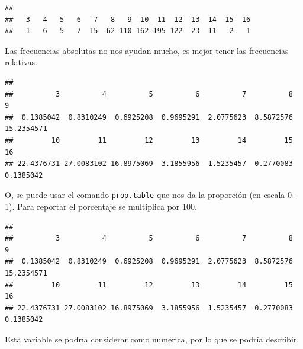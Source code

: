 \documentclass[
]{article}
\newenvironment{Shaded}{\begin{snugshade}}{\end{snugshade}}
\newcommand{\DecValTok}[1]{\textcolor[rgb]{0.00,0.00,0.81}{#1}}
\newcommand{\FunctionTok}[1]{\textcolor[rgb]{0.00,0.00,0.00}{#1}}
\newcommand{\NormalTok}[1]{#1}
\newcommand{\SpecialCharTok}[1]{\textcolor[rgb]{0.00,0.00,0.00}{#1}}
\begin{document}
\begin{verbatim}
## 
##   3   4   5   6   7   8   9  10  11  12  13  14  15  16 
##   1   6   5   7  15  62 110 162 195 122  23  11   2   1
\end{verbatim}

Las frecuencias absolutas no nos ayudan mucho, es mejor tener las
frecuencias relativas.

\begin{Shaded}
\end{Shaded}

\begin{verbatim}
## 
##          3          4          5          6          7          8          9 
##  0.1385042  0.8310249  0.6925208  0.9695291  2.0775623  8.5872576 15.2354571 
##         10         11         12         13         14         15         16 
## 22.4376731 27.0083102 16.8975069  3.1855956  1.5235457  0.2770083  0.1385042
\end{verbatim}

O, se puede usar el comando \texttt{prop.table} que nos da la proporción
(en escala 0-1). Para reportar el porcentaje se multiplica por 100.

\begin{Shaded}
\end{Shaded}

\begin{verbatim}
## 
##          3          4          5          6          7          8          9 
##  0.1385042  0.8310249  0.6925208  0.9695291  2.0775623  8.5872576 15.2354571 
##         10         11         12         13         14         15         16 
## 22.4376731 27.0083102 16.8975069  3.1855956  1.5235457  0.2770083  0.1385042
\end{verbatim}

Esta variable se podría considerar como numérica, por lo que se podría
describir.

\begin{Shaded}
\end{Shaded}
\end{document}
